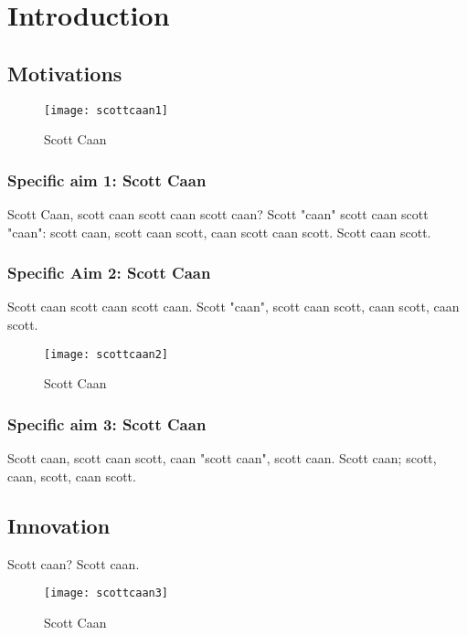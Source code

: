 \chapter{Introduction}

\section{Motivations}

\begin {figure}[htbp]
\centering
\texttt{[image: scottcaan1]}
\caption{Scott Caan}
\label{fig1}
\centering
\end{figure}
\subsection{Specific aim 1: Scott Caan }

        	Scott Caan, scott caan scott caan scott caan? Scott "caan" scott caan scott "caan": scott caan, scott caan scott, caan scott caan scott. Scott caan scott.
\subsection{Specific Aim 2: Scott Caan}

Scott caan scott caan scott caan. Scott "caan", scott caan scott\cite{caan1}, caan scott, caan scott.
 
\begin {figure}[htbp]
\centering
\texttt{[image: scottcaan2]}
\caption{Scott Caan}
\label{fig2}
\centering
\end{figure}

 
\subsection {Specific aim 3: Scott Caan}

Scott caan, scott caan scott, caan\cite{caan2} "scott caan", scott caan. Scott caan; scott, caan, scott, caan scott. 

\section{Innovation}
Scott caan? Scott caan.
\begin {figure}[htbp]
\centering
\texttt{[image: scottcaan3]}
\caption{Scott Caan}
\label{fig3}
\centering
\end{figure}

